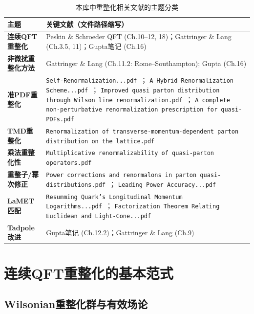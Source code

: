 \documentclass[12pt,a4paper]{ctexart}
\theoremstyle{definition}
\begin{document}
\begin{table}[H]
\centering
\caption{本库中重整化相关文献的主题分类}
\label{tab:ren_papers}
\small
\begin{tabular}{lp{8cm}}
\toprule
主题 & 关键文献（文件路径缩写） \\
\midrule
\textbf{连续QFT重整化} &
Peskin \& Schroeder QFT (Ch.10--12, 18)；Gattringer \& Lang (Ch.3.5, 11)；Gupta笔记 (Ch.16) \\
\textbf{非微扰重整化方法} &
Gattringer \& Lang (Ch.11.2: Rome--Southampton); Gupta (Ch.16) \\
\textbf{准PDF重整化} &
\texttt{Self-Renormalization...pdf}~\cite{Huo2021self}；
\texttt{A Hybrid Renormalization Scheme...pdf}~\cite{Ji2021hybrid}；
\texttt{Improved quasi parton distribution through Wilson line renormalization.pdf}~\cite{Chen2018WLrenorm}；
\texttt{A complete non-perturbative renormalization prescription for quasi-PDFs.pdf} \\
\textbf{TMD重整化} &
\texttt{Renormalization of transverse-momentum-dependent parton distribution on the lattice.pdf}~\cite{Zhang2022renormTMD} \\
\textbf{乘法重整化性} &
\texttt{Multiplicative renormalizability of quasi-parton operators.pdf}~\cite{Li2019multiplicative} \\
\textbf{重整子/幂次修正} &
\texttt{Power corrections and renormalons in parton quasi-distributions.pdf}~\cite{Braun2019power}；
\texttt{Leading Power Accuracy...pdf}~\cite{Zhang2023leadingPower} \\
\textbf{LaMET匹配} &
\texttt{Resumming Quark's Longitudinal Momentum Logarithms...pdf}~\cite{Su2023RGR}；
\texttt{Factorization Theorem Relating Euclidean and Light-Cone...pdf}~\cite{Izubuchi2018} \\
\textbf{Tadpole改进} &
Gupta笔记 (Ch.12.2)；Gattringer \& Lang (Ch.9) \\
\bottomrule
\end{tabular}
\end{table}

\section{连续QFT重整化的基本范式}

\subsection{Wilsonian重整化群与有效场论}
\end{document}
